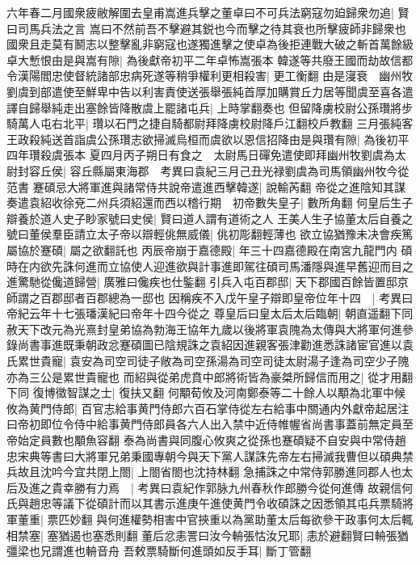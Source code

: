 六年春二月國衆疲敝解圍去皇甫嵩進兵擊之董卓曰不可兵法窮寇勿廹歸衆勿追|{
	賢曰司馬兵法之言}
嵩曰不然前吾不擊避其鋭也今而擊之待其衰也所擊疲師非歸衆也國衆且走莫有鬭志以整擊亂非窮寇也遂獨進擊之使卓為後拒連戰大破之斬首萬餘級卓大慙恨由是與嵩有隙|{
	為後獻帝初平二年卓怖嵩張本}
韓遂等共廢王國而劫故信都令漢陽閻忠使督統諸部忠病死遂等稍爭權利更相殺害|{
	更工衡翻}
由是寖衰　幽州牧劉虞到部遣使至鮮卑中告以利害責使送張舉張純首厚加購賞丘力居等聞虞至喜各遣譯自歸舉純走出塞餘皆降散虞上罷諸屯兵|{
	上時掌翻奏也}
但留降虜校尉公孫瓚將步騎萬人屯右北平|{
	瓚以石門之捷自騎都尉拜降虜校尉降戶江翻校戶教翻}
三月張純客王政殺純送首詣虞公孫瓚志欲掃滅烏桓而虞欲以恩信招降由是與瓚有隙|{
	為後初平四年瓚殺虞張本}
夏四月丙子朔日有食之　太尉馬日磾免遣使即拜幽州牧劉虞為太尉封容丘侯|{
	容丘縣屬東海郡　考異曰袁紀三月己丑光禄劉虞為司馬領幽州牧今從范書}
蹇碩忌大將軍進與諸常侍共說帝遣進西擊韓遂|{
	說輸芮翻}
帝從之進陰知其謀奏遣袁紹收徐兗二州兵須紹還而西以稽行期　初帝數失皇子|{
	數所角翻}
何皇后生子辯養於道人史子眇家號曰史侯|{
	賢曰道人謂有道術之人}
王美人生子協董太后自養之號曰董侯羣臣請立太子帝以辯輕佻無威儀|{
	佻初彫翻輕薄也}
欲立協猶豫未决會疾篤屬協於蹇碩|{
	屬之欲翻託也}
丙辰帝崩于嘉德殿|{
	年三十四嘉德殿在南宮九龍門内}
碩時在内欲先誅何進而立協使人迎進欲與計事進即駕往碩司馬潘隱與進早舊迎而目之進驚馳從儳道歸營|{
	廣雅曰儳疾也仕鍳翻}
引兵入屯百郡邸|{
	天下郡國百餘皆置邸京師謂之百郡邸者百郡總為一邸也}
因稱疾不入戊午皇子辯即皇帝位年十四　|{
	考異曰帝紀云年十七張璠漢紀曰帝年十四今從之}
尊皇后曰皇太后太后臨朝|{
	朝直遥翻下同}
赦天下改元為光熹封皇弟協為勃海王協年九歲以後將軍袁隗為太傳與大將軍何進參錄尚書事進既秉朝政忿蹇碩圖已陰規誅之袁紹因進親客張津勸進悉誅諸宦官進以袁氏累世貴寵|{
	袁安為司空司徒子敞為司空孫湯為司空司徒太尉湯子逢為司空少子隗亦為三公是累世貴寵也}
而紹與從弟虎賁中郎將術皆為豪桀所歸信而用之|{
	從才用翻下同}
復博徵智謀之士|{
	復扶又翻}
何顒荀攸及河南鄭泰等二十餘人以顒為北軍中候攸為黄門侍郎|{
	百官志給事黄門侍郎六百石掌侍從左右給事中關通内外獻帝起居注曰帝初即位令侍中給事黄門侍郎員各六人出入禁中近侍帷幄省尚書事蓋前無定員至帝始定員數也顒魚容翻}
泰為尚書與同腹心攸爽之從孫也蹇碩疑不自安與中常侍趙忠宋典等書曰大將軍兄弟秉國專朝今與天下黨人謀誅先帝左右掃滅我曹但以碩典禁兵故且沈吟今宜共閉上閤|{
	上閤省閤也沈持林翻}
急捕誅之中常侍郭勝進同郡人也太后及進之貴幸勝有力焉　|{
	考異曰袁紀作郭脉九州春秋作郎勝今從何進傳}
故親信何氏與趙忠等議下從碩計而以其書示進庚午進使黄門令收碩誅之因悉領其屯兵票騎將軍董重|{
	票匹妙翻}
與何進權勢相害中官挾重以為黨助董太后每欲參干政事何太后輒相禁塞|{
	塞猶遏也塞悉則翻}
董后忿恚詈曰汝今輈張怙汝兄耶|{
	恚於避翻賢曰輈張猶彊梁也兄謂進也輈音舟}
吾敕票騎斷何進頭如反手耳|{
	斷丁管翻}
